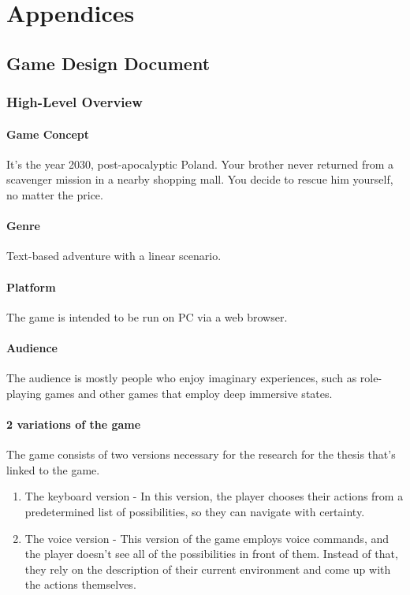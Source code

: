 \chapter*{Appendices}

\setcounter{section}{0}

\renewcommand{\thesection}{\Alph{section}}

\appendix
\section{Game Design Document} 
\label{appendix_a}
\subsection{High-Level Overview}
\subsubsection{Game Concept}

It's the year 2030, post-apocalyptic Poland. Your brother never returned from a scavenger mission in a nearby shopping mall.
You decide to rescue him yourself, no matter the price.

\subsubsection{Genre}
Text-based adventure with a linear scenario.

\subsubsection{Platform}
The game is intended to be run on PC via a web browser.

\subsubsection{Audience}
The audience is mostly people who enjoy imaginary experiences, such as role-playing games and other games that employ deep immersive states.
\subsubsection{2 variations of the game}

The game consists of two versions necessary for the research for the thesis that's linked to the game.
\begin{enumerate}
    \item The keyboard version - In this version, the player chooses their actions from a predetermined
    list of possibilities, so they can navigate with certainty. 
    \item The voice version - This version of the game employs voice commands, and the player doesn't see 
    all of the possibilities in front of them. Instead of that, they rely on the description of their current 
    environment and come up with the actions themselves.
\end{enumerate}


